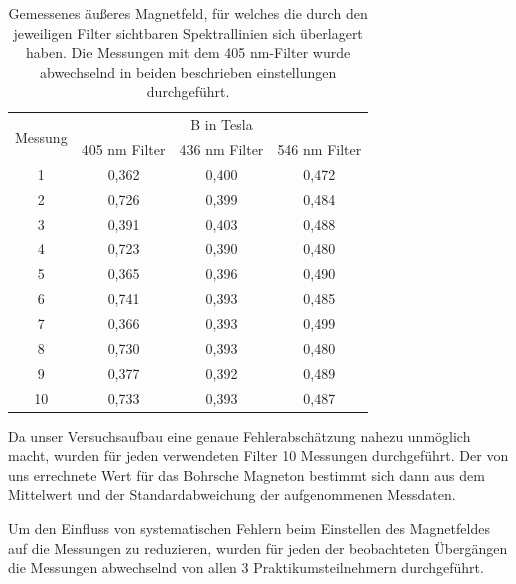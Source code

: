 \documentclass[bigchapter,colorback,accentcolor=tud4b,linedtoc,11pt]{tudreport}
\begin{document}
\begin{table}[H]
  \begin{center}
  \begin{tabular}{|c|c|c|c|}
    \hline
    \multirow{2}{*}{Messung} & \multicolumn{3}{c|}{B in Tesla}     \\ \cline{2-4}
                             & 405 nm Filter & 436 nm Filter & 546 nm Filter
                                                                   \\ \hline 
    1                        & 0,362        & 0,400        & 0,472 \\ \hline
    2                        & 0,726        & 0,399        & 0,484 \\ \hline
    3                        & 0,391        & 0,403        & 0,488 \\ \hline
    4                        & 0,723        & 0,390        & 0,480 \\ \hline
    5                        & 0,365        & 0,396        & 0,490 \\ \hline
    6                        & 0,741        & 0,393        & 0,485 \\ \hline
    7                        & 0,366        & 0,393        & 0,499 \\ \hline
    8                        & 0,730        & 0,393        & 0,480 \\ \hline
    9                        & 0,377        & 0,392        & 0,489 \\ \hline
    10                       & 0,733        & 0,393        & 0,487 \\ \hline
	\end{tabular}
    \caption{Gemessenes äußeres Magnetfeld, für welches die durch den jeweiligen
    Filter sichtbaren Spektrallinien sich überlagert haben. Die Messungen mit
    dem 405 nm-Filter wurde abwechselnd in beiden beschrieben einstellungen
    durchgeführt.}
  \end{center}
\end{table}

Da unser Versuchsaufbau eine genaue Fehlerabschätzung nahezu unmöglich macht,
wurden für jeden verwendeten Filter 10 Messungen durchgeführt. Der von uns
errechnete Wert für das Bohrsche Magneton bestimmt sich dann aus dem Mittelwert
und der Standardabweichung der aufgenommenen Messdaten.

Um den Einfluss von systematischen Fehlern beim Einstellen des Magnetfeldes auf
die Messungen zu reduzieren, wurden für jeden der beobachteten Übergängen die
Messungen abwechselnd von allen 3 Praktikumsteilnehmern durchgeführt.
\end{document}
